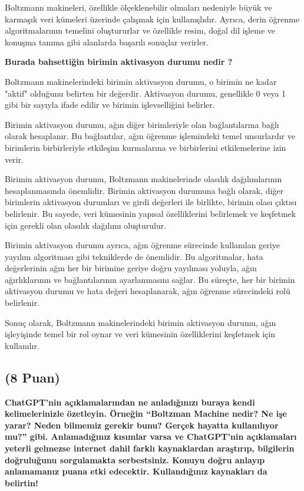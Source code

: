 \documentclass[11pt]{article}
\begin{document}
Boltzmann makineleri, özellikle ölçeklenebilir olmaları nedeniyle büyük ve karmaşık veri kümeleri üzerinde çalışmak için kullanışlıdır. Ayrıca, derin öğrenme algoritmalarının temelini oluştururlar ve özellikle resim, doğal dil işleme ve konuşma tanıma gibi alanlarda başarılı sonuçlar verirler.

\textbf{Burada bahsettiğin birimin aktivasyon durumu nedir ?}

Boltzmann makinelerindeki birimin aktivasyon durumu, o birimin ne kadar "aktif" olduğunu belirten bir değerdir. Aktivasyon durumu, genellikle 0 veya 1 gibi bir sayıyla ifade edilir ve birimin işlevselliğini belirler.

Birimin aktivasyon durumu, ağın diğer birimleriyle olan bağlantılarına bağlı olarak hesaplanır. Bu bağlantılar, ağın öğrenme işlemindeki temel unsurlardır ve birimlerin birbirleriyle etkileşim kurmalarına ve birbirlerini etkilemelerine izin verir.

Birimin aktivasyon durumu, Boltzmann makinelerinde olasılık dağılımlarının hesaplanmasında önemlidir. Birimin aktivasyon durumuna bağlı olarak, diğer birimlerin aktivasyon durumları ve girdi değerleri ile birlikte, birimin olası çıktısı belirlenir. Bu sayede, veri kümesinin yapısal özelliklerini belirlemek ve keşfetmek için gerekli olan olasılık dağılımı oluşturulur.

Birimin aktivasyon durumu ayrıca, ağın öğrenme sürecinde kullanılan geriye yayılım algoritması gibi tekniklerde de önemlidir. Bu algoritmalar, hata değerlerinin ağın her bir birimine geriye doğru yayılması yoluyla, ağın ağırlıklarının ve bağlantılarının ayarlanmasını sağlar. Bu süreçte, her bir birimin aktivasyon durumu ve hata değeri hesaplanarak, ağın öğrenme sürecindeki rolü belirlenir.

Sonuç olarak, Boltzmann makinelerindeki birimin aktivasyon durumu, ağın işleyişinde temel bir rol oynar ve veri kümesinin özelliklerini keşfetmek için kullanılır.

\subsection{(8 Puan)} \textbf{ChatGPT’nin açıklamalarından ne anladığınızı buraya kendi kelimelerinizle özetleyin. Örneğin ``Boltzman Machine nedir? Ne işe yarar? Neden bilmemiz gerekir bunu? Gerçek hayatta kullanılıyor mu?'' gibi. Anlamadığınız kısımlar varsa ve ChatGPT’nin açıklamaları yeterli gelmezse internet dahil farklı kaynaklardan araştırıp, bilgilerin doğruluğunu sorgulamakta serbestsiniz. Konuyu doğru anlayıp anlamamanız puana etki edecektir. Kullandığınız kaynakları da belirtin!}
\end{document}
